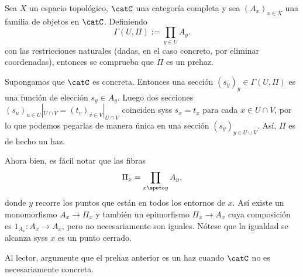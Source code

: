 \begin{exn}
	Sea $X$ un espacio topológico, $\catC$ una categoría completa y sea $(A_x)_{x\in X}$ una familia de objetos en $\catC$. Definiendo
	$$ \Gamma(U, \Pi) := \prod_{y\in U} A_y. $$
	con las restricciones naturales (dadas, en el caso concreto, por eliminar coordenadas),
	entonces se comprueba que $\Pi$ es un prehaz.

	Supongamos que $\catC$ es concreta.
	Entonces una sección $(s_y)_y \in \Gamma(U, \Pi)$ es una función de elección $s_y \in A_y$.
	Luego dos secciones $(s_u)_{u\in U}|_{U \cap V} = (t_v)_{v\in V}|_{U \cap V}$ coinciden syss $s_x = t_x$ para cada $x \in U \cap V$,
	por lo que podemos pegarlas de manera única en una sección $(s_y )_{y\in U\cup V}$.
	Así, $\Pi$ es de hecho un haz.

	Ahora bien, es fácil notar que las fibras
	$$ \Pi_x = \prod_{x \speto y} A_y, $$
	donde $y$ recorre los puntos que están en todos los entornos de $x$.
	Así existe un monomorfismo $A_x \to \Pi_x$ y también un epimorfismo $\Pi_x \to A_x$ cuya composición es $1_{A_x} \colon A_x \to A_x$,
	pero no necesariamente son iguales.
	Nótese que la igualdad se alcanza syss $x$ es un punto cerrado.
\end{exn}
Al lector, argumente que el prehaz anterior es un haz cuando $\catC$ no es necesariamente concreta.

